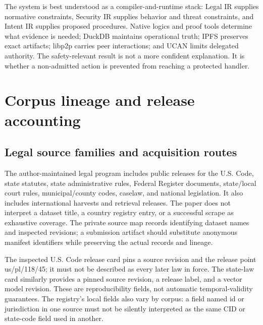 \documentclass{article}
\begin{document}
The system is best understood as a compiler-and-runtime stack: Legal IR supplies normative constraints, Security IR supplies behavior and threat constraints, and Intent IR supplies proposed procedures. Native logics and proof tools determine what evidence is needed; DuckDB maintains operational truth; IPFS preserves exact artifacts; libp2p carries peer interactions; and UCAN limits delegated authority. The safety-relevant result is not a more confident explanation. It is whether a non-admitted action is prevented from reaching a protected handler.

\clearpage
\nocite{mcp,mcp-auth,catala,cvefixes,quack,ipfs,libp2p,ucan}


\clearpage
\appendix

\section{Corpus lineage and release accounting}

\subsection{Legal source families and acquisition routes}

The author-maintained legal program includes public releases for the U.S. Code, state statutes, state administrative rules, Federal Register documents, state/local court rules, municipal/county codes, caselaw, and national legislation. It also includes international harvests and retrieval releases. The paper does not interpret a dataset title, a country registry entry, or a successful scrape as exhaustive coverage. The private source map records identifying dataset names and inspected revisions; a submission artifact should substitute anonymous manifest identifiers while preserving the actual records and lineage.


The inspected U.S. Code release card pins a source revision and the release point us/pl/118/45; it must not be described as every later law in force. The state-law card similarly provides a pinned source revision, a release label, and a vector model revision. These are reproducibility fields, not automatic temporal-validity guarantees. The registry's local fields also vary by corpus: a field named id or jurisdiction in one source must not be silently interpreted as the same CID or state-code field used in another.
\end{document}
